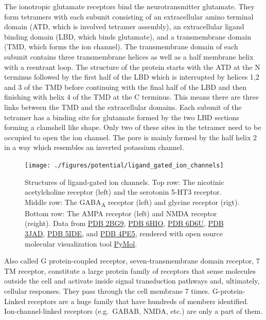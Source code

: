 The ionotropic glutamate receptors bind the neurotransmitter glutamate. They form tetramers with each subunit consisting of an extracellular amino terminal domain (ATD, which is involved tetramer assembly), an extracellular ligand binding domain (LBD, which binds glutamate), and a transmembrane domain (TMD, which forms the ion channel). The transmembrane domain of each subunit contains three transmembrane helices as well as a half membrane helix with a reentrant loop. The structure of the protein starts with the ATD at the N terminus followed by the first half of the LBD which is interrupted by helices 1,2 and 3 of the TMD before continuing with the final half of the LBD and then finishing with helix 4 of the TMD at the C terminus. This means there are three links between the TMD and the extracellular domains. Each subunit of the tetramer has a binding site for glutamate formed by the two LBD sections forming a clamshell like shape. Only two of these sites in the tetramer need to be occupied to open the ion channel. The pore is mainly formed by the half helix 2 in a way which resembles an inverted potassium channel.



\begin{figure}

{\centering \texttt{[image: ./figures/potential/ligand\_gated\_ion\_channels]} 

}

\caption{Structures of ligand-gated ion channels. Top row: The nicotinic acetylcholine receptor (left) and the serotonin 5-HT3 receptor. Middle row: The GABA\textsubscript{A} receptor (left) and glycine receptor (rigt). Bottom row: The AMPA receptor (left) and NMDA receptor (reight). Data from \href{https://www.rcsb.org/structure/2BG9}{PDB 2BG9}, \href{https://www.rcsb.org/structure/6HIO}{PDB 6HIO}, \href{https://www.rcsb.org/structure/6D6U}{PDB 6D6U}, \href{https://www.rcsb.org/structure/3JAD}{PDB 3JAD}, \href{https://www.rcsb.org/structure/5IDE}{PDB 5IDE}, and \href{https://www.rcsb.org/structure/4PE5}{PDB 4PE5}, rendered with open source molecular visualization tool \href{https://pymol.org/2/}{PyMol}.}\label{fig:lgic}
\end{figure}

Also called G protein-coupled receptor, seven-transmembrane domain receptor, 7 TM receptor, constitute a large protein family of receptors that sense molecules outside the cell and activate inside signal transduction pathways and, ultimately, cellular responses. They pass through the cell membrane 7 times. G-protein-Linked receptors are a huge family that have hundreds of members identified. Ion-channel-linked receptors (e.g.~GABAB, NMDA, etc.) are only a part of them.

